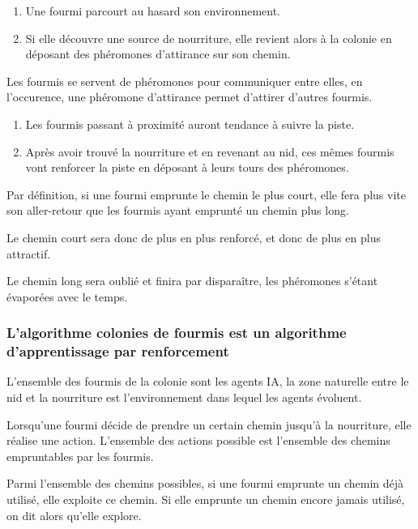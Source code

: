 \documentclass[
12pt,
french,
]{article}
\begin{document}
\begin{enumerate}
\def\labelenumi{\arabic{enumi}.}
\item
  Une fourmi parcourt au hasard son environnement.
\item
  Si elle découvre une source de nourriture, elle revient alors à la
  colonie en déposant des phéromones d'attirance sur son chemin.
\end{enumerate}

Les fourmis se servent de phéromones pour communiquer entre elles, en
l'occurence, une phéromone d'attirance permet d'attirer d'autres
fourmis.

\begin{enumerate}
\def\labelenumi{\arabic{enumi}.}
\setcounter{enumi}{2}
\item
  Les fourmis passant à proximité auront tendance à suivre la piste.
\item
  Après avoir trouvé la nourriture et en revenant au nid, ces mêmes
  fourmis vont renforcer la piste en déposant à leurs tours des
  phéromones.
\end{enumerate}

Par définition, si une fourmi emprunte le chemin le plus court, elle
fera plus vite son aller-retour que les fourmis ayant emprunté un chemin
plus long.

Le chemin court sera donc de plus en plus renforcé, et donc de plus en
plus attractif.

Le chemin long sera oublié et finira par disparaître, les phéromones
s'étant évaporées avec le temps.

\hypertarget{lalgorithme-colonies-de-fourmis-est-un-algorithme-dapprentissage-par-renforcement}{%
\subsubsection{L'algorithme colonies de fourmis est un algorithme
d'apprentissage par
renforcement}\label{lalgorithme-colonies-de-fourmis-est-un-algorithme-dapprentissage-par-renforcement}}

L'ensemble des fourmis de la colonie sont les agents IA, la zone
naturelle entre le nid et la nourriture est l'environnement dans lequel
les agents évoluent.

Lorsqu'une fourmi décide de prendre un certain chemin jusqu'à la
nourriture, elle réalise une action. L'ensemble des actions possible est
l'ensemble des chemins empruntables par les fourmis.

Parmi l'ensemble des chemins possibles, si une fourmi emprunte un chemin
déjà utilisé, elle exploite ce chemin. Si elle emprunte un chemin encore
jamais utilisé, on dit alors qu'elle explore.
\end{document}
